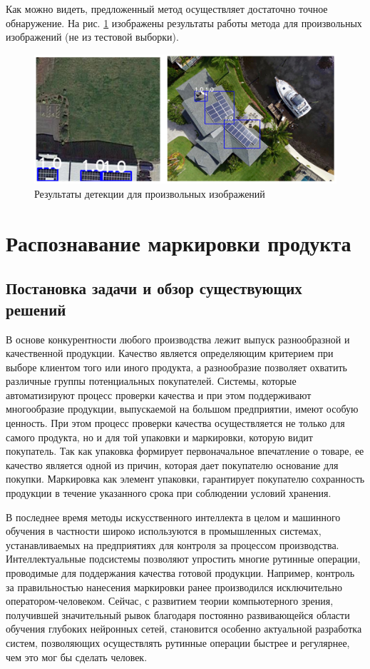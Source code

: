 Как можно видеть, предложенный метод осуществляет достаточно точное обнаружение. На рис. \ref{fig:random_results} изображены результаты работы метода для произвольных изображений (не из тестовой выборки).

\begin{figure}[!ht]
	\centering
	\includegraphics[width=16cm]{man-source/images/ch4/pic4-23.png}
	\caption{Результаты детекции для произвольных изображений}
	\label{fig:random_results}
\end{figure}

\section{Распознавание маркировки продукта}

\subsection{Постановка задачи и обзор существующих решений}

В основе конкурентности любого производства лежит выпуск разнообразной и качественной продукции. Качество является определяющим критерием при выборе клиентом того или иного продукта, а разнообразие позволяет охватить различные группы потенциальных покупателей. Системы, которые автоматизируют процесс проверки качества и при этом поддерживают многообразие продукции, выпускаемой на большом предприятии, имеют особую ценность. При этом процесс проверки качества осуществляется не только для самого продукта, но и для той упаковки и маркировки, которую видит покупатель. Так как упаковка формирует первоначальное впечатление о товаре, ее качество является одной из причин, которая дает покупателю основание для покупки. Маркировка как элемент упаковки, гарантирует покупателю сохранность продукции в течение указанного срока при соблюдении условий хранения.

В последнее время методы искусственного интеллекта в целом и машинного обучения в частности широко используются в промышленных системах, устанавливаемых на предприятиях для контроля за процессом производства. Интеллектуальные подсистемы позволяют упростить многие рутинные операции, проводимые для поддержания качества готовой продукции. Например, контроль за правильностью нанесения маркировки ранее производился исключительно оператором-человеком. Сейчас, с развитием теории компьютерного зрения, получившей значительный рывок благодаря постоянно развивающейся области обучения глубоких нейронных сетей, становится особенно актуальной разработка систем, позволяющих осуществлять рутинные операции быстрее и регулярнее, чем это мог бы сделать человек.

